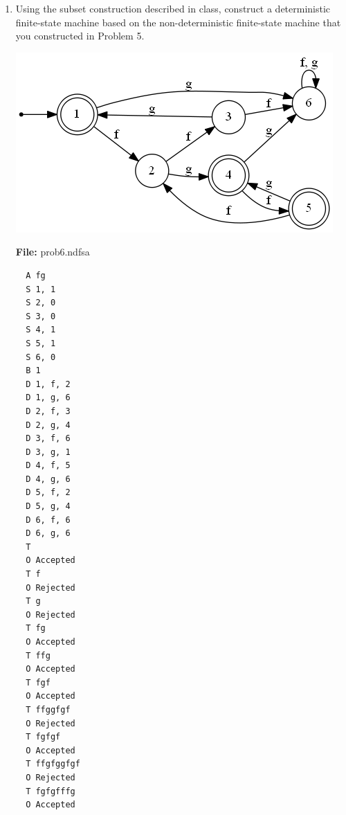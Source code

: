 \documentclass[a4paper]{article}
\begin{document}
\begin{enumerate}
\begin{verbatim}
    node [shape = point] x
    node [shape = circle] 0
    node [shape = circle] 1
    node [shape = circle] 2
    node [shape = circle] 3
    node [shape = circle] 4
    node [shape = circle] 5
    node [shape = circle] 6
    node [shape = circle] 7
    node [shape = circle] 8
    node [shape = circle] 9
    node [shape = circle] 10
    node [shape = circle] 11
    node [shape = circle] 12
    node [shape = circle] 13
    node [shape = doublecircle] 14
  
    x -> 0
    0 -> 1 [label = "@"]
    0 -> 14 [label = "@"]
    1 -> 2 [label = "@"]
    1 -> 5 [label = "@"]
    1 -> 9 [label = "@"]
    2 -> 3 [label = "f"]
    3 -> 4 [label = "g"]
    4 -> 13 [label = "@"]
    5 -> 6 [label = "f"]
    6 -> 7 [label = "f"]
    7 -> 8 [label = "g"]
    8 -> 13 [label = "@"]
    9 -> 10 [label = "f"]
    10 -> 11 [label = "g"]
    11 -> 12 [label = "f"]
    12 -> 13 [label = "@"]
    13 -> 1 [label = "@"]
    13 -> 14 [label = "@"]
  }
    \end{verbatim}

    \newpage
    \item Using the subset construction described in class, construct a 
    deterministic finite-state machine based on the non-deterministic finite-state 
    machine that you constructed in Problem 5.
        \begin{center}
      \includegraphics[scale=0.5]{6} \\
    \end{center}

    \textbf{File:} prob6.ndfsa
    \begin{multicols}{2}
    \begin{verbatim}
  A fg
  S 1, 1
  S 2, 0
  S 3, 0
  S 4, 1
  S 5, 1
  S 6, 0
  B 1
  D 1, f, 2
  D 1, g, 6
  D 2, f, 3
  D 2, g, 4
  D 3, f, 6
  D 3, g, 1
  D 4, f, 5
  D 4, g, 6
  D 5, f, 2
  D 5, g, 4
  D 6, f, 6
  D 6, g, 6
  T 
  O Accepted
  T f
  O Rejected
  T g
  O Rejected
  T fg
  O Accepted
  T ffg
  O Accepted
  T fgf
  O Accepted
  T ffggfgf
  O Rejected
  T fgfgf
  O Accepted
  T ffgfggfgf
  O Rejected
  T fgfgfffg
  O Accepted
    \end{verbatim}
    \end{multicols}


\end{enumerate}
\end{document}
